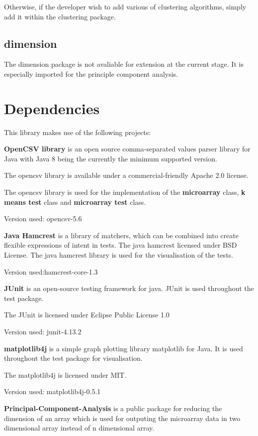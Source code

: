 \documentclass[]{final_report}
\begin{document}
Otherwise, if the developer wish to add various of clustering algorithms, simply add it within the clustering package.

\subsection{dimension}
The dimension package is not avaliable for extension at the current stage. It is especially imported for the principle component analysis.

\section{Dependencies}
This library makes use of the following projects:

\textbf{OpenCSV library} is an open source comma-separated values parser library for Java with Java 8 being the currently the minimum supported version.

The opencsv library is available under a commercial-friendly Apache 2.0 license.

The opencsv library is used for the implementation of the \textbf{microarray} class, \textbf{k means test} class and \textbf{microarray test} class.

Version used: opencsv-5.6

\textbf{Java Hamcrest} is a library of matchers, which can be combined into create flexible expressions of intent in tests. 
The java hamcrest licensed under BSD License.
The java hamcrest library is used for the visualisation of the tests.

Version used:hamcrest-core-1.3

\textbf{JUnit} is an open-source testing framework for java. JUnit is used throughout the test package.

The JUnit is licensed under Eclipse Public License 1.0

Version used: junit-4.13.2

\textbf{matplotlib4j} is a simple graph plotting library matplotlib for Java. It is used throughout the test package for visualisation.

The matplotlib4j is licensed under MIT.

Version used: matplotlib4j-0.5.1

\textbf{Principal-Component-Analysis} is a public package for reducing the dimension of an array which is used for outputing the microarray data in two dimensional array instead of n dimensional array.
\end{document}
